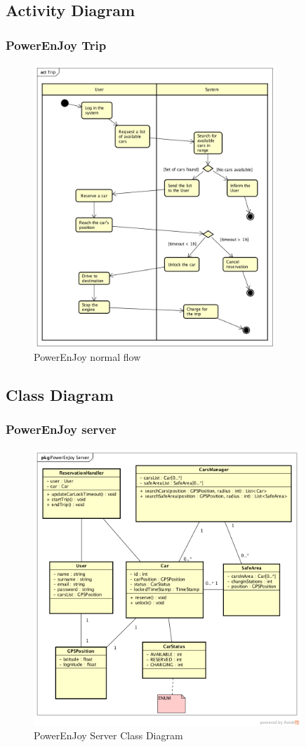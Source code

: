 \pagebreak


\subsection{Activity Diagram}
\subsubsection{PowerEnJoy Trip}
\begin{figure}[h]
	\centering
	\includegraphics[width=345px]{img/activity_trip}
	\caption{PowerEnJoy normal flow}
\end{figure}
\FloatBarrier

\pagebreak
\subsection{Class Diagram}
\subsubsection{PowerEnJoy server}
\begin{figure}[h]
	\centering
	\includegraphics[width=380px]{img/classdiagram_server}
	\caption{PowerEnJoy Server Class Diagram}
\end{figure}
\FloatBarrier
